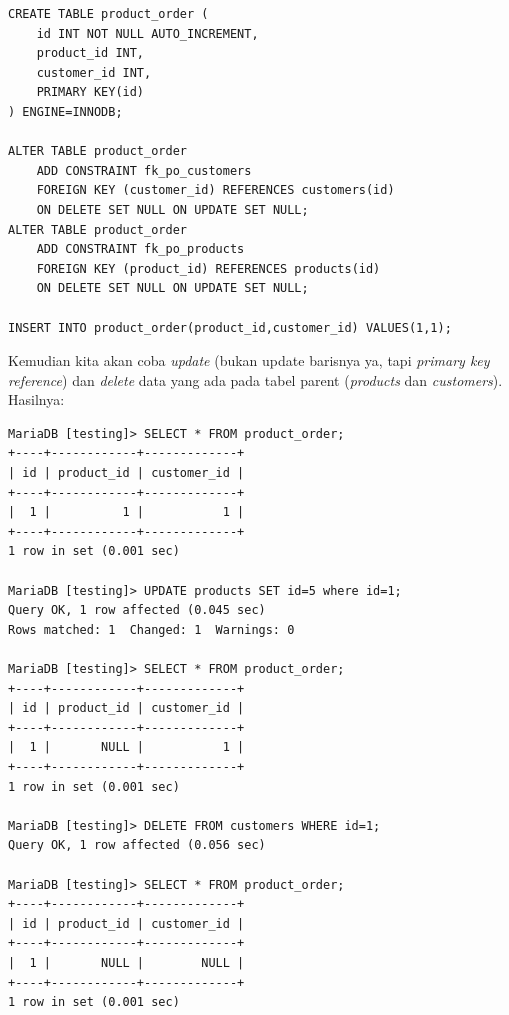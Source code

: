 \documentclass[a4paper]{article}
\begin{document}
\begin{enumerate}
\begin{lstlisting}
CREATE TABLE product_order (
    id INT NOT NULL AUTO_INCREMENT,
    product_id INT,
    customer_id INT,
    PRIMARY KEY(id)
) ENGINE=INNODB;

ALTER TABLE product_order
	ADD CONSTRAINT fk_po_customers 
	FOREIGN KEY (customer_id) REFERENCES customers(id)
	ON DELETE SET NULL ON UPDATE SET NULL;
ALTER TABLE product_order 
	ADD CONSTRAINT fk_po_products
	FOREIGN KEY (product_id) REFERENCES products(id)
	ON DELETE SET NULL ON UPDATE SET NULL;

INSERT INTO product_order(product_id,customer_id) VALUES(1,1);
\end{lstlisting}

Kemudian kita akan coba  \textit{update} (bukan update barisnya ya, tapi \textit{primary key reference}) dan \textit{delete} data yang ada pada tabel parent (\textit{products} dan \textit{customers}). Hasilnya:

\begin{lstlisting}
MariaDB [testing]> SELECT * FROM product_order;
+----+------------+-------------+
| id | product_id | customer_id |
+----+------------+-------------+
|  1 |          1 |           1 |
+----+------------+-------------+
1 row in set (0.001 sec)

MariaDB [testing]> UPDATE products SET id=5 where id=1;
Query OK, 1 row affected (0.045 sec)
Rows matched: 1  Changed: 1  Warnings: 0

MariaDB [testing]> SELECT * FROM product_order;
+----+------------+-------------+
| id | product_id | customer_id |
+----+------------+-------------+
|  1 |       NULL |           1 |
+----+------------+-------------+
1 row in set (0.001 sec)

MariaDB [testing]> DELETE FROM customers WHERE id=1;
Query OK, 1 row affected (0.056 sec)

MariaDB [testing]> SELECT * FROM product_order;
+----+------------+-------------+
| id | product_id | customer_id |
+----+------------+-------------+
|  1 |       NULL |        NULL |
+----+------------+-------------+
1 row in set (0.001 sec)
\end{lstlisting}

\end{enumerate}
\end{document}
